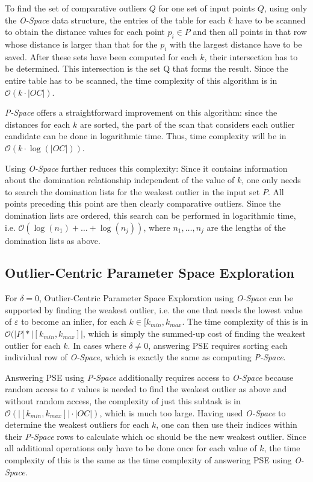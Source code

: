 \documentclass[runningheads]{llncs}
\begin{document}
To find the set of comparative outliers $Q$ for one set of input points $Q$, using only the \emph{O-Space} data structure, the entries of the table for each $k$ have to be scanned to obtain the distance values for each point $p_i\in P$ and then all points in that row whose distance is larger than that for the $p_i$ with the largest distance have to be saved. After these sets have been computed for each $k$, their intersection has to be determined. This intersection is the set Q that forms the result. Since the entire table has to be scanned, the time complexity of this algorithm is in $\mathcal{O}(k\cdot |OC|)$.

\emph{P-Space} offers a straightforward improvement on this algorithm: since the distances for each $k$ are sorted, the part of the scan that considers each outlier candidate can be done in logarithmic time. Thus, time complexity will be in $\mathcal{O}(k\cdot \log(|OC|))$.

Using \emph{O-Space} further reduces this complexity: Since it contains information about the domination relationship independent of the value of $k$, one only needs to search the domination lists for the weakest outlier in the input set $P$. All points preceding this point are then clearly comparative outliers. Since the domination lists are ordered, this search can be performed in logarithmic time, i.e. $\mathcal{O}(\log(n_1) + \ldots + \log(n_j))$, where $n_1, \ldots , n_j$ are the lengths of the domination lists as above.
\subsection{Outlier-Centric Parameter Space Exploration}
 
For $\delta=0$, Outlier-Centric Parameter Space Exploration using \emph{O-Space} can be supported by finding the weakest outlier, i.e. the one that needs the lowest value of $\varepsilon$ to become an inlier, for each $k \in [k_{min},k_{max}$. The time complexity of this is in $\mathcal{O}(|P| * |[k_{min}, k_{max}]|$, which is simply the summed-up cost of finding the weakest outlier for each $k$. In cases where $\delta \neq 0$, answering PSE requires sorting each individual row of \emph{O-Space}, which is exactly the same as computing \emph{P-Space}.

Answering PSE using \emph{P-Space} additionally requires access to \emph{O-Space} because random access to $\varepsilon$ values is needed to find the weakest outlier as above and without random access, the complexity of just this subtask is in $\mathcal{O}(|[k_{min},k_{max}]| \cdot |OC|)$, which is much too large. Having used \emph{O-Space} to determine the weakest outliers for each $k$, one can then use their indices within their \emph{P-Space} rows to calculate which oc should be the new weakest outlier. Since all additional operations only have to be done once for each value of $k$, the time complexity of this is the same as the time complexity of answering PSE using \emph{O-Space}.
\end{document}
